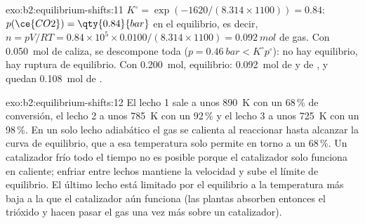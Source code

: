 \begin{solution}{exo:b2:equilibrium-shifts:11}
$K^\circ = \exp(-1620/(8.314 \times 1100)) = 0.84$: $p(\ce{CO2}) =
\qty{0.84}{bar}$ en el equilibrio, es decir, $n = pV/RT = 0.84 \times 10^5 \times
0.0100/(8.314 \times 1100) = \qty{0.092}{mol}$ de gas. Con \qty{0.050}{mol}
de caliza, se descompone toda ($p = \qty{0.46}{bar} < K^\circ p^\circ$):
no hay equilibrio, hay ruptura de equilibrio. Con \qty{0.200}{mol}, equilibrio:
\qty{0.092}{mol} de  y de , y quedan \qty{0.108}{mol} de .
\end{solution}

\begin{solution}{exo:b2:equilibrium-shifts:12}
El lecho 1 sale a unos \qty{890}{K} con un 68\,\% de conversión, el lecho 2 a unos
\qty{785}{K} con un 92\,\% y el lecho 3 a unos \qty{725}{K} con un 98\,\%. En un solo
lecho adiabático el gas se calienta al reaccionar hasta alcanzar la curva de
equilibrio, que a esa temperatura solo permite en torno a un 68\,\%. Un catalizador frío
todo el tiempo no es posible porque el catalizador solo funciona en caliente; enfriar
entre lechos mantiene la velocidad y sube el límite de equilibrio. El último lecho
está limitado por el equilibrio a la temperatura más baja a la que el catalizador
aún funciona (las plantas absorben entonces el trióxido y hacen pasar el gas una vez más sobre
un catalizador).
\end{solution}

